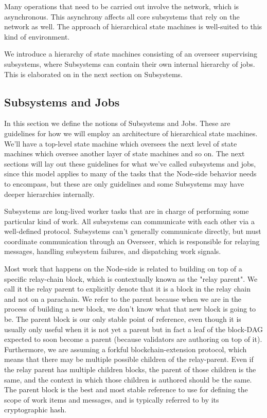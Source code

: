 Many operations that need to be carried out involve the network, which is
asynchronous. This asynchrony affects all core subsystems that rely on the
network as well. The approach of hierarchical state machines is well-suited to
this kind of environment.
\newline

We introduce a hierarchy of state machines consisting of an overseer supervising
subsystems, where Subsystems can contain their own internal hierarchy of jobs.
This is elaborated on in the next section on Subsystems.

\subsection{Subsystems and Jobs}

In this section we define the notions of Subsystems and Jobs. These are
guidelines for how we will employ an architecture of hierarchical state
machines. We'll have a top-level state machine which oversees the next level of
state machines which oversee another layer of state machines and so on. The next
sections will lay out these guidelines for what we've called subsystems and
jobs, since this model applies to many of the tasks that the Node-side behavior
needs to encompass, but these are only guidelines and some Subsystems may have
deeper hierarchies internally.
\newline

Subsystems are long-lived worker tasks that are in charge of performing some
particular kind of work. All subsystems can communicate with each other via a
well-defined protocol. Subsystems can't generally communicate directly, but must
coordinate communication through an Overseer, which is responsible for relaying
messages, handling subsystem failures, and dispatching work signals.
\newline

Most work that happens on the Node-side is related to building on top of a
specific relay-chain block, which is contextually known as the "relay parent".
We call it the relay parent to explicitly denote that it is a block in the relay
chain and not on a parachain. We refer to the parent because when we are in the
process of building a new block, we don't know what that new block is going to
be. The parent block is our only stable point of reference, even though it is
usually only useful when it is not yet a parent but in fact a leaf of the
block-DAG expected to soon become a parent (because validators are authoring on
top of it). Furthermore, we are assuming a forkful blockchain-extension
protocol, which means that there may be multiple possible children of the
relay-parent. Even if the relay parent has multiple children blocks, the parent
of those children is the same, and the context in which those children is
authored should be the same. The parent block is the best and most stable
reference to use for defining the scope of work items and messages, and is
typically referred to by its cryptographic hash.
\newline

